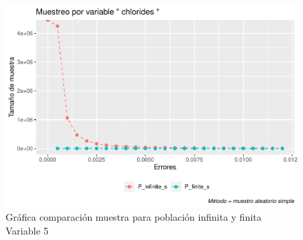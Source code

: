 \documentclass[
]{article}
\begin{document}
\begin{figure}
\centering
\includegraphics{1_examen_solucion_files/figure-latex/grafica va5-1.pdf}
\caption{Gráfica comparación muestra para población infinita y finita
Variable 5}
\end{figure}
\end{document}
